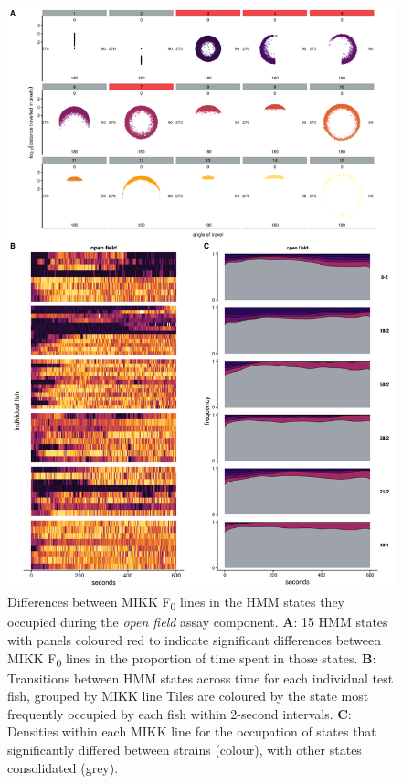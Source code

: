 \documentclass[
]{book}
\begin{document}
\begin{figure}
\includegraphics[width=1\linewidth]{figs/mikk_behaviour/select_0.08_15_sge_of} \caption{Differences between MIKK F\textsubscript{0} lines in the HMM states they occupied during the \emph{open field} assay component. \textbf{A}: 15 HMM states with panels coloured red to indicate significant differences between MIKK F\textsubscript{0} lines in the proportion of time spent in those states. \textbf{B}: Transitions between HMM states across time for each individual test fish, grouped by MIKK line Tiles are coloured by the state most frequently occupied by each fish within 2-second intervals. \textbf{C}: Densities within each MIKK line for the occupation of states that significantly differed between strains (colour), with other states consolidated (grey).}\label{fig:F2-time-sge-of}
\end{figure}
\end{document}
